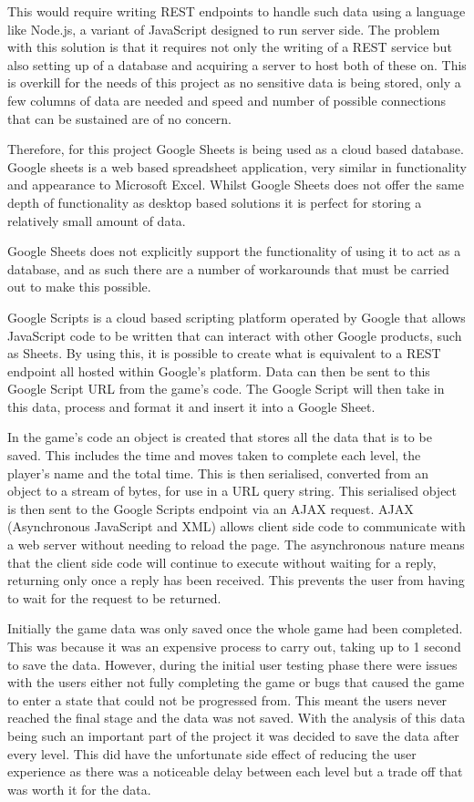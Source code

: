 \documentclass[12pt,a4paper]{report}
\begin{document}
This would require writing REST endpoints to handle such data using a language like Node.js, a variant of JavaScript designed to run server side. The problem with this solution is that it requires not only the writing of a REST service but also setting up of a database and acquiring a server to host both of these on. This is overkill for the needs of this project as no sensitive data is being stored, only a few columns of data are needed and speed and number of possible connections that can be sustained are of no concern.
 
Therefore, for this project Google Sheets is being used as a cloud based database. Google sheets is a web based spreadsheet application, very similar in functionality and appearance to Microsoft Excel. Whilst Google Sheets does not offer the same depth of functionality as desktop based solutions it is perfect for storing a relatively small amount of data.

Google Sheets does not explicitly support the functionality of using it to act as a database, and as such there are a number of workarounds that must be carried out to make this possible.

Google Scripts is a cloud based scripting platform operated by Google that allows JavaScript code to be written that can interact with other Google products, such as Sheets. By using this, it is possible to create what is equivalent to a REST endpoint all hosted within Google's platform. 
Data can then be sent to this Google Script URL from the game's code. The Google Script will then take in this data, process and format it and insert it into a Google Sheet.

In the game's code an object is created that stores all the data that is to be saved. This includes the time and moves taken to complete each level, the player's name and the total time. This is then serialised, converted from an object to a stream of bytes, for use in a URL query string. This serialised object is then sent to the Google Scripts endpoint via an AJAX request. AJAX (Asynchronous JavaScript and XML) allows client side code to communicate with a web server without needing to reload the page. The asynchronous nature means that the client side code will continue to execute without waiting for a reply, returning only once a reply has been received. This prevents the user from having to wait for the request to be returned.

Initially the game data was only saved once the whole game had been completed. This was because it was an expensive process to carry out, taking up to 1 second to save the data. However, during the initial user testing phase there were issues with the users either not fully completing the game or bugs that caused the game to enter a state that could not be progressed from. This meant the users never reached the final stage and the data was not saved. With the analysis of this data being such an important part of the project it was decided to save the data after every level. This did have the unfortunate side effect of reducing the user experience as there was a noticeable delay between each level but a trade off that was worth it for the data.
\end{document}
